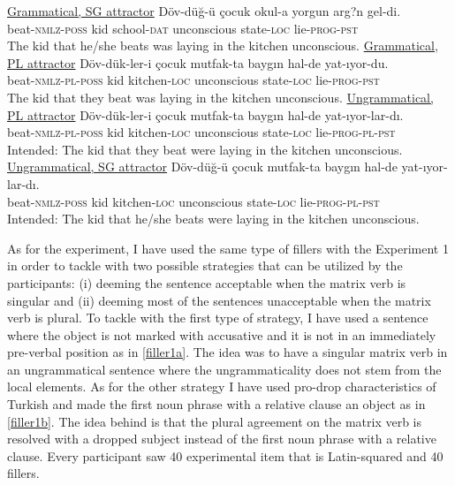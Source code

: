 \documentclass[doc]{apa6}
\begin{document}
\begin{exe}
\ex \label{prereg1}
  \begin{xlist}
  \ex \underline{Grammatical, SG attractor} \label{reg1}
      \gll D\"{o}v-d\"{u}\u{g}-\"{u} \c{c}ocuk okul-a yorgun arg?n gel-di.\\
  beat-\textsc{nmlz}-\textsc{poss} kid school-\textsc{dat} unconscious state-\textsc{loc} lie-\textsc{prog}-\textsc{pst}\\ 
      \glt The kid that he/she beats was laying in the kitchen unconscious.
  \ex \underline{Grammatical, PL attractor} \label{reg2}
      \gll D\"{o}v-d\"{u}k-ler-i \c{c}ocuk mutfak-ta bayg{\i}n hal-de yat-{\i}yor-du.\\
  beat-\textsc{nmlz}-\textsc{pl}-\textsc{poss} kid kitchen-\textsc{loc} unconscious state-\textsc{loc} lie-\textsc{prog}-\textsc{pst}\\
      \glt The kid that they beat was laying in the kitchen unconscious.
  \ex \underline{Ungrammatical, PL attractor} \label{reg3}
      \gll D\"{o}v-d\"{u}k-ler-i \c{c}ocuk mutfak-ta bayg{\i}n hal-de yat-{\i}yor-lar-d{\i}.\\
  beat-\textsc{nmlz}-\textsc{pl}-\textsc{poss} kid kitchen-\textsc{loc} unconscious state-\textsc{loc} lie-\textsc{prog}-\textsc{pl}-\textsc{pst}\\
      \glt Intended: The kid that they beat were laying in the kitchen unconscious.
  \ex \underline{Ungrammatical, SG attractor} \label{reg4}
      \gll D\"{o}v-d\"{u}\u{g}-\"{u} \c{c}ocuk mutfak-ta bayg{\i}n hal-de yat-{\i}yor-lar-d{\i}.\\
  beat-\textsc{nmlz}-\textsc{poss} kid kitchen-\textsc{loc} unconscious state-\textsc{loc} lie-\textsc{prog}-\textsc{pl}-\textsc{pst}\\
      \glt Intended: The kid that he/she beats were laying in the kitchen unconscious.
  \end{xlist}
\end{exe}

As for the experiment, I have used the same type of fillers with the Experiment 1 in order to tackle with two possible strategies that can be utilized by the participants: (i) deeming the sentence acceptable when the matrix verb is singular and (ii) deeming most of the sentences unacceptable when the matrix verb is plural. To tackle with the first type of strategy, I have used a sentence where the object is not marked with accusative and it is not in an immediately pre-verbal position as in \autoref{filler1a}. The idea was to have a singular matrix verb in an ungrammatical sentence where the ungrammaticality does not stem from the local elements. As for the other strategy I have used pro-drop characteristics of Turkish and made the first noun phrase with a relative clause an object as in \autoref{filler1b}. The idea behind is that the plural agreement on the matrix verb is resolved with a dropped subject instead of the first noun phrase with a relative clause. Every participant saw 40 experimental item that is Latin-squared and 40 fillers.
\end{document}
